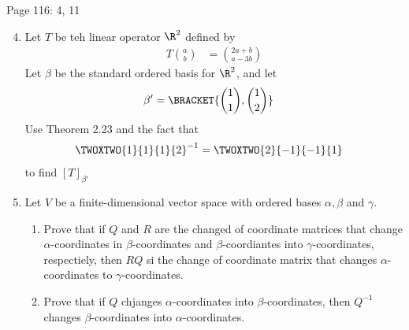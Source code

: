 \documentclass[10pt,a4paper]{report}
\begin{document}
Page 116: 4, 11
\begin{enumerate}[label=Page 116:\arabic*)]
	\setcounter{enumi}{3}
	\item Let $T$ be teh linear operator $\R^2$ defined by 
	\begin{align*}
		T\binom{a}{b} &= \binom{2a+b}{a-3b}
	\end{align*}Let $\beta$ be the standard ordered basis for $\R^2$, and let 
	\begin{align*}
		\beta' &= \BRACKET{\binom{1}{1}, \binom{1}{2}}
	\end{align*}Use Theorem 2.23 and the fact that
	\begin{align*}
		\TWOXTWO{1}{1}{1}{2}^{-1} &= \TWOXTWO{2}{-1}{-1}{1}
	\end{align*}to find $[T]_{\beta'}$
	\setcounter{enumi}{10}
	\item Let $V$ be a finite-dimensional vector space with ordered bases $\alpha, \beta$ and $\gamma$.
	\begin{enumerate}[label=(\alph*)]
		\item Prove that if $Q$ and $R$ are the changed of coordinate matrices that change $\alpha$-coordinates in $\beta$-coordinates and $\beta$-coordiantes into $\gamma$-coordinates, respectiely, then $RQ$ si the change of coordinate matrix that changes $\alpha$-coordinates to $\gamma$-coordinates.
		\item Prove that if $Q$ chjanges $\alpha$-coordinates into $\beta$-coordinates, then $Q^{-1}$ changes $\beta$-coordinates into $\alpha$-coordinates.
	
	\end{enumerate}
\end{enumerate}
\end{document}
